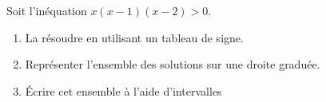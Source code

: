 
\begin{exercice}\label{exoPremiere-0024}

    Soit l'inéquation \( x(x-1)(x-2)>0\).
    \begin{enumerate}
        \item
La résoudre en utilisant un tableau de signe.
 \item Représenter l'ensemble des solutions sur une droite graduée.
\item Écrire cet ensemble à l'aide d'intervalles
 
    \end{enumerate}

\end{exercice}
